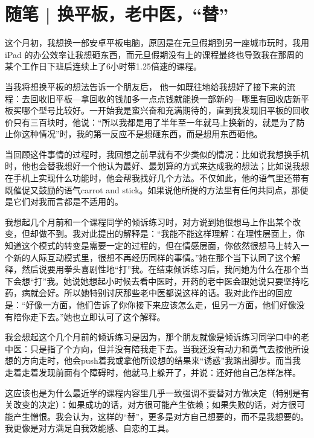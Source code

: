 \chapter{随笔 | 换平板，老中医，“替”}


这个月初，我想换一部安卓平板电脑，原因是在元旦假期到另一座城市玩时，我用 iPad 的办公效率让我想砸东西，而元旦假期没有上的课程最终也导致我在那周的某个工作日下班后连续上了6小时带1.25倍速的课程。

当我将想换平板的想法告诉一个朋友后， 他一如既往地给我想好了接下来的流程：去回收旧平板—拿回收的钱加多一点点钱就能换一部新的—哪里有回收店\pozhehao{}新平板买哪个型号比较好。一开始我是蛮兴奋和充满期待的，直到我发现旧平板的回收价只有三百块时，他说：“所以我都是用了半年至一年就马上换新的，就是为了防止你这种情况”时，我的第一反应不是想砸东西，而是想用东西砸他。

当回顾这件事情的过程时，我回想之前早就有不少类似的情况：比如说我想换手机时，他也会替我想好一个他认为最好、最划算的方式来达成我的想法；比如说我想在手机上实现什么功能时，他会帮我找好几个方法。不仅如此，他的语气里还带有既催促又鼓励的语气\pozhehao{}carrot and stick。如果说他所提的方法里有任何共同点，那便是\pozhehao{}它们对我而言都是不适用的。

我想起几个月前和一个课程同学的倾诉练习时，对方说到她很想马上作出某个改变，但却做不到。我对此提出的解释是：“我能不能这样理解：在理性层面上，你知道这个模式的转变是需要一定的过程的，但在情感层面，你依然很想马上转入一个新的人际互动模式里，很想不再经历同样的事情。”她在那个当下认同了这个解释，然后说要用拳头喜剧性地“打”我。在结束倾诉练习后，我问她为什么在那个当下会想“打”我。她说她想起小时候去看中医时，开药的老中医会跟她说只要坚持吃药，病就会好。所以她特别讨厌那些老中医都说这样的话。我对此作出的回应是：“好像一方面，他们告诉了你你接下来应该怎么走，但另一方面，他们好像没有陪你走下去。”她也立即认可了这个解释。

我会想起这个几个月前的倾诉练习是因为，那个朋友就像是倾诉练习同学口中的老中医：只是指了个方向，但并没有陪我走下去。当我还没有动力和勇气去按他所设想的方向走时，他会push着我或拿他所设想的结果来“诱惑”我踏出脚步。而当我走着走着发现前面有个障碍时，他就马上躲开了，并说：还好他自己怎样怎样。

这应该也是为什么最近学的课程内容里几乎一致强调不要替对方做决定（特别是有关改变的决定）：如果成功的话，对方很可能产生依赖；如果失败的话，对方很可能产生憎恨。我会认为，这样的“替”，更多是对方自己想要的，而不是我想要的。我更像是对方满足自我效能感、自恋的工具。

